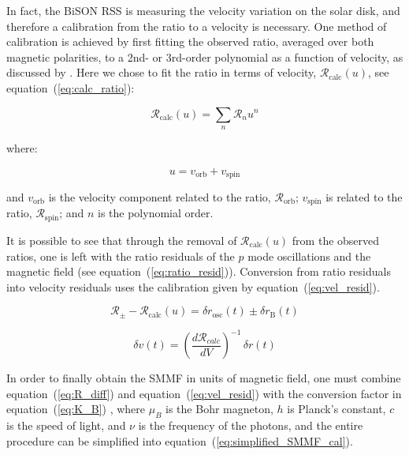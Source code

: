 In fact, the BiSON RSS is measuring the velocity variation on the solar disk, and therefore a calibration from the ratio to a velocity is necessary. One method of calibration is achieved by first fitting the observed ratio, averaged over both magnetic polarities, to a 2nd- or 3rd-order polynomial as a function of velocity, as discussed by \citet{elsworth_techniques_1995}. Here we chose to fit the ratio in terms of velocity, $\mathcal{R}_{\mathrm{calc}}(u)$, see equation~(\ref{eq:calc_ratio}):

\begin{equation}
\mathcal{R}_{\mathrm{calc}}(u) = \sum_{n} \mathcal{R}_{n} u^n
\label{eq:calc_ratio}
\end{equation}

where:

\begin{equation}
u = v_{\mathrm{orb}} + v_{\mathrm{spin}}
\label{eq:stn_vel}
\end{equation}

and $v_{\mathrm{orb}}$ is the velocity component related to the ratio,  $\mathcal{R}_{\mathrm{orb}}$; $v_{\mathrm{spin}}$ is related to the ratio, $\mathcal{R}_{\mathrm{spin}}$; and $n$ is the polynomial order.

It is possible to see that through the removal of $\mathcal{R}_{\mathrm{calc}}(u)$ from the observed ratios, one is left with the ratio residuals of the $p$ mode oscillations and the magnetic field (see equation~(\ref{eq:ratio_resid})). Conversion from ratio residuals into velocity residuals uses the calibration given by equation~(\ref{eq:vel_resid}).

\begin{equation}
\mathcal{R}_{\pm} - \mathcal{R}_{\mathrm{calc}}(u) = \delta {r}_{\mathrm{osc}}(t) \pm \delta {r}_{\mathrm{B}}(t)
\label{eq:ratio_resid}
\end{equation}

\begin{equation}
\delta v(t) = \left( \frac{d\mathcal{R}_{calc}}{dV} \right)^{-1} \, \delta {r}(t)
\label{eq:vel_resid}
\end{equation}

In order to finally obtain the SMMF in units of magnetic field, one must combine equation~(\ref{eq:R_diff}) and  equation~(\ref{eq:vel_resid}) with the conversion factor in equation~(\ref{eq:K_B}) \citep{dumbill_observation_1999}, where $\mu_B$ is the Bohr magneton, $h$ is Planck's constant, $c$ is the speed of light, and $\nu$ is the frequency of the photons, and the entire procedure can be simplified into equation~(\ref{eq:simplified_SMMF_cal}).

